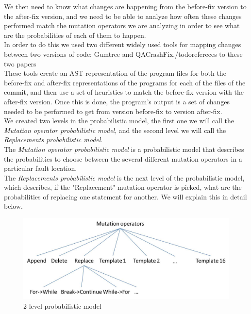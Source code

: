 \documentclass[conference]{IEEEtran}
\begin{document}
We then need to know what changes are happening from the before-fix version to the after-fix version, and we need to be able to analyze how often these changes performed match the mutation operators we are analyzing in order to see what are the probabilities of each of them to happen.\\
In order to do this we used two different widely used tools for mapping changes between two versions of code: Gumtree and QACrashFix./todo{refereces to these two papers}\\
These tools create an AST representation of the program files for both the before-fix and after-fix representations of the programs for each of the files of the commit, and then use a set of heuristics to match the before-fix version with the after-fix version. Once this is done, the program's output is a set of changes needed to be performed to get from version before-fix to version after-fix.\\
We created two levels in the probabilistic model, the first one we will call the \textit{Mutation operator probabilistic model}, and the second level we will call the \textit{Replacements probabilistic model}.\\
The \textit{Mutation operator probabilistic model} is a probabilistic model that describes the probabilities to choose between the several different mutation operators in a particular fault location.\\
The \textit{Replacements probabilistic model} is the next level of the probabilistic model, which describes, if the "Replacement" mutation operator is picked, what are the probabilities of replacing one statement for another. We will explain this in detail below.\\

\begin{figure}[!h]
  \centering
    \includegraphics[scale=0.4]{Picture2}
  \caption{2 level probabilistic model}
  \label{fig:probModel}
\end{figure}
\end{document}
